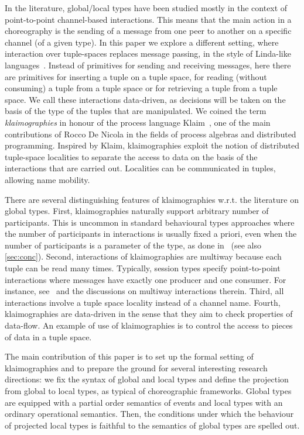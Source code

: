 In the literature, global/local types have been studied mostly in the
context of point-to-point channel-based interactions. This means that
the main action in a choreography is the sending of a message from one
peer to another on a specific channel (of a given type). In this paper we
explore a different setting, where interaction over tuple-spaces
replaces message passing, in the style of Linda-like
languages~\cite{DBLP:journals/toplas/Gelernter85}.  Instead of
primitives for sending and receiving messages, here there are
primitives for inserting a tuple on a tuple space, for reading
(without consuming) a tuple from a tuple space or for retrieving a
tuple from a tuple space. We call these interactions data-driven, as
decisions will be taken on the basis of the type of the tuples that
are manipulated. We coined the term \emph{klaimographies} in honour of the
process language Klaim~\cite{DBLP:journals/tse/NicolaFP98,klaim}, one
of the main contributions of Rocco De Nicola in the fields of process
algebras and distributed programming. Inspired by Klaim,
klaimographies exploit the notion of distributed tuple-space
localities to separate the access to data on the basis of the
interactions that are carried out. Localities can be communicated in
tuples, allowing name mobility.

There are several distinguishing features of klaimographies w.r.t.
the literature on global types.
%
First, klaimographies naturally support arbitrary number of
participants.
%
This is uncommon in standard behavioural types approaches where the
number of participants in interactions is usually fixed a priori, even
when the number of participants is a parameter of the type, as done
in~\cite{ydbh10} (see also \cref{sec:conc}).
%
Second, interactions of klaimographies are multiway because each tuple
can be read many times.
%
Typically, session types specify point-to-point interactions where
messages have exactly one producer and one consumer.
%
For instance, see~\cite{cdp12} and the discussions on multiway
interactions therein.
%
Third, all interactions involve a tuple space locality instead of a
channel name.
%
Fourth, klaimographies are data-driven in the sense that they
aim to check properties of data-flow.
%
An example of use of klaimographies is to control the access to pieces
of data in a tuple space.

The main contribution of this paper is to set up the formal setting of
klaimographies and to prepare the ground for several interesting
research directions: we fix the syntax of global and local types and
define the projection from global to local types, as typical of
choreographic frameworks.  Global types are equipped with a partial
order semantics of events and local types with an ordinary operational
semantics. Then, the conditions under which the behaviour of projected
local types is faithful to the semantics of global types are spelled
out.


